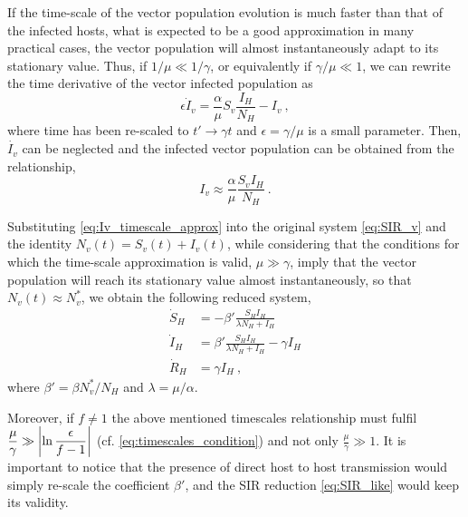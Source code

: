 If the time-scale of the vector population evolution is much faster than
that of the infected hosts, what is expected to be a good approximation in many
practical cases, the vector population will almost instantaneously adapt to its
stationary value. Thus, if $1/\mu\ll1/\gamma$, or equivalently if
$\gamma/\mu\ll1$, we can rewrite the time derivative of the vector infected
population as
\begin{equation}
    \epsilon\dot{I}_v=\frac{\alpha}{\mu}S_v\frac{I_H}{N_H} - I_v \ ,
\end{equation}
where time has been re-scaled to $t'\to\gamma t$ and $\epsilon=\gamma/\mu$
is a small parameter. Then, $\dot{I_v}$ can be neglected and the infected
vector population can be obtained from the relationship,
\begin{equation}\label{eq:Iv_timescale_approx}
    I_v\approx\frac{\alpha}{\mu}\frac{S_v I_H}{N_H} \ .
\end{equation}

Substituting \cref{eq:Iv_timescale_approx} into the original system
\cref{eq:SIR_v} and the identity $N_v(t)=S_v(t)+I_v(t)$, while considering that
the conditions for which the time-scale approximation is valid, $\mu\gg\gamma$,
imply that the vector population will reach its stationary value almost
instantaneously, so that $N_v(t)\approx N_v^*$, we obtain the following reduced
system,
\begin{equation}\label{eq:SIR_like}
    \begin{aligned}
        \dot{S}_H & =-\beta'\frac{S_H I_H}{\lambda N_H + I_H}            \\
        \dot{I}_H & =\beta'\frac{S_H I_H}{\lambda N_H + I_H}- \gamma I_H \\
        \dot{R}_H & =\gamma I_H \ ,
    \end{aligned}
\end{equation}
where $\beta'=\beta N_v^*/N_H$ and $\lambda=\mu/\alpha$.

Moreover, if $f\neq1$ the above mentioned timescales relationship
must fulfil
$\displaystyle\frac{\mu}{\gamma}\gg\abs{\ln{\frac{\epsilon}{f-1}}}$ (cf.
\cref{eq:timescales_condition}) and not only
$\displaystyle\frac{\mu}{\gamma}\gg 1$. It is important to notice that the
presence of direct host to host transmission would simply re-scale the
coefficient $\beta'$, and the SIR reduction \cref{eq:SIR_like} would keep its
validity.

